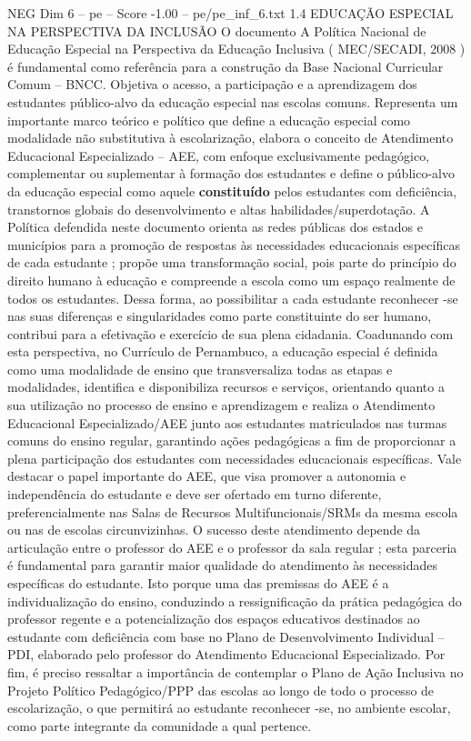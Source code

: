 \begin{textsample}{NEG Dim 6 – pe – Score -1.00 – pe/pe\_inf\_6.txt}  \label{ex:f6_neg_032}
1.4 EDUCAÇÃO ESPECIAL NA PERSPECTIVA DA INCLUSÃO O documento A Política Nacional de Educação Especial na Perspectiva da Educação Inclusiva ( MEC/SECADI, 2008 ) é fundamental como referência para a construção da Base Nacional Curricular Comum – BNCC.
Objetiva o acesso, a participação e a aprendizagem dos estudantes público-alvo da educação especial nas escolas comuns.
Representa um importante marco teórico e político que define a educação especial como modalidade não substitutiva à escolarização, elabora o conceito de Atendimento Educacional Especializado – AEE, com enfoque exclusivamente pedagógico, complementar ou suplementar à formação dos estudantes e define o público-alvo da educação especial como aquele \textbf{constituído} pelos estudantes com deficiência, transtornos globais do desenvolvimento e altas habilidades/superdotação.
A Política defendida neste documento orienta as redes públicas dos estados e municípios para a promoção de respostas às necessidades educacionais específicas de cada estudante ; propõe uma transformação social, pois parte do princípio do direito humano à educação e compreende a escola como um espaço realmente de todos os estudantes.
Dessa forma, ao possibilitar a cada estudante reconhecer -se nas suas diferenças e singularidades como parte constituinte do ser humano, contribui para a efetivação e exercício de sua plena cidadania.
Coadunando com esta perspectiva, no Currículo de Pernambuco, a educação especial é definida como uma modalidade de ensino que transversaliza todas as etapas e modalidades, identifica e disponibiliza recursos e serviços, orientando quanto a sua utilização no processo de ensino e aprendizagem e realiza o Atendimento Educacional Especializado/AEE junto aos estudantes matriculados nas turmas comuns do ensino regular, garantindo ações pedagógicas a fim de proporcionar a plena participação dos estudantes com necessidades educacionais específicas.
Vale destacar o papel importante do AEE, que visa promover a autonomia e independência do estudante e deve ser ofertado em turno diferente, preferencialmente nas Salas de Recursos Multifuncionais/SRMs da mesma escola ou nas de escolas circunvizinhas.
O sucesso deste atendimento depende da articulação entre o professor do AEE e o professor da sala regular ; esta parceria é fundamental para garantir maior qualidade do atendimento às necessidades específicas do estudante.
Isto porque uma das premissas do AEE é a individualização do ensino, conduzindo a ressignificação da prática pedagógica do professor regente e a potencialização dos espaços educativos destinados ao estudante com deficiência com base no Plano de Desenvolvimento Individual – PDI, elaborado pelo professor do Atendimento Educacional Especializado.
Por fim, é preciso ressaltar a importância de contemplar o Plano de Ação Inclusiva no Projeto Político Pedagógico/PPP das escolas ao longo de todo o processo de escolarização, o que permitirá ao estudante reconhecer -se, no ambiente escolar, como parte integrante da comunidade a qual pertence.

\end{textsample}
